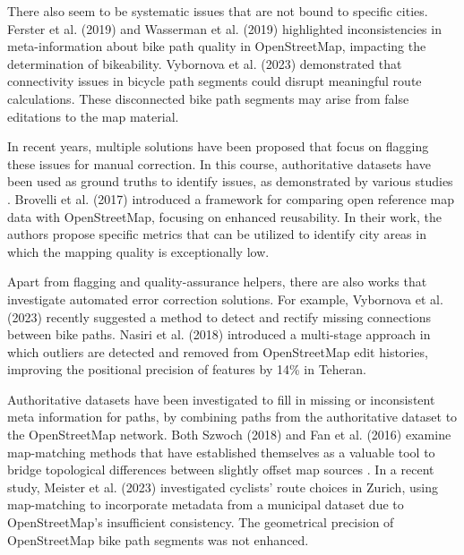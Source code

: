 There also seem to be systematic issues that are not bound to specific cities. Ferster et al. (2019) \cite{ferster_using_2019} and Wasserman et al. (2019) \cite{wasserman_evaluating_2019} highlighted inconsistencies in meta-information about bike path quality in OpenStreetMap, impacting the determination of bikeability. Vybornova et al. (2023) \cite{vybornova_automated_2023} demonstrated that connectivity issues in bicycle path segments could disrupt meaningful route calculations. These disconnected bike path segments may arise from false editations to the map material.

In recent years, multiple solutions have been proposed that focus on flagging these issues for manual correction. In this course, authoritative datasets have been used as ground truths to identify issues, as demonstrated by various studies \cite{haklay_how_2010, jokar_arsanjani_quality_2015, ludwig_comparison_2011}. Brovelli et al. (2017) \cite{brovelli_towards_2017} introduced a framework for comparing open reference map data with OpenStreetMap, focusing on enhanced reusability. In their work, the authors propose specific metrics that can be utilized to identify city areas in which the mapping quality is exceptionally low.

Apart from flagging and quality-assurance helpers, there are also works that investigate automated error correction solutions. For example, Vybornova et al. (2023) \cite{vybornova_automated_2023} recently suggested a method to detect and rectify missing connections between bike paths. Nasiri et al. (2018) \cite{nasiri_improving_2018} introduced a multi-stage approach in which outliers are detected and removed from OpenStreetMap edit histories, improving the positional precision of features by 14\% in Teheran.  

Authoritative datasets have been investigated to fill in missing or inconsistent meta information for paths, by combining paths from the authoritative dataset to the OpenStreetMap network. Both Szwoch (2018) \cite{szwoch_combining_2019} and Fan et al. (2016) \cite{fan_polygon-based_2016} examine map-matching methods that have established themselves as a valuable tool to bridge topological differences between slightly offset map sources \cite{chao_survey_2020}. In a recent study, Meister et al. (2023) \cite{meister_route_2023} investigated cyclists' route choices in Zurich, using map-matching to incorporate metadata from a municipal dataset due to OpenStreetMap's insufficient consistency. The geometrical precision of OpenStreetMap bike path segments was not enhanced.

